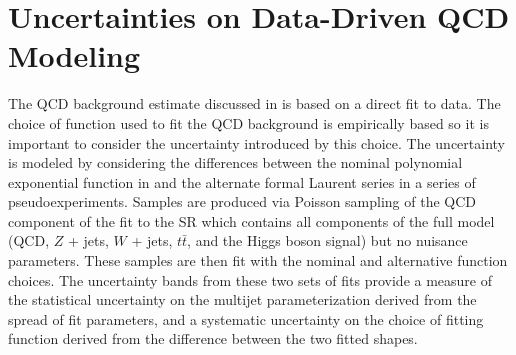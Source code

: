 \section{Uncertainties on Data-Driven QCD Modeling} \label{sec:systematics:qcd_modeling}

The QCD background estimate discussed in  is based on
a direct fit to data. The choice of function used to fit the QCD background is
empirically based so it is important to consider the uncertainty introduced by
this choice.  The uncertainty is modeled by considering the differences between
the nominal polynomial exponential function in 
and the alternate formal Laurent series  in a
series of pseudoexperiments. Samples are produced via Poisson sampling of the
QCD component of the fit to the SR which contains all components of the full
model (QCD, $Z$ + jets, $W$ + jets, $t\bar{t}$, and the Higgs boson signal) but
no nuisance parameters. These samples are then fit with the nominal and
alternative function choices.  The uncertainty bands from these two sets of
fits provide a measure of the statistical uncertainty on the multijet
parameterization derived from the spread of fit parameters, and a systematic
uncertainty on the choice of fitting function derived from the difference
between the two fitted shapes.
